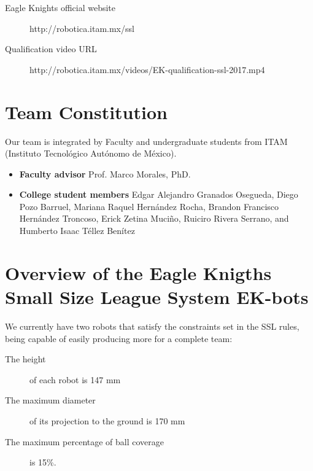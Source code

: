 \documentclass[]{llncs}
\newcommand{\TODO}[1]{{\textcolor{blue}{ToDo: {#1}}}}
\begin{document}
\begin{description}
	\item[Eagle Knights official website] http://robotica.itam.mx/ssl
	\item[Qualification video URL] http://robotica.itam.mx/videos/EK-qualification-ssl-2017.mp4
\end{description}


\section{Team Constitution}

Our team is integrated by Faculty and undergraduate students from ITAM (Instituto Tecnológico Autónomo de México).
\begin{itemize}
\item {\bf Faculty advisor} Prof. Marco Morales, PhD.
\item {\bf College student members} 
Edgar Alejandro Granados Osegueda,
Diego Pozo Barruel,
Mariana Raquel Hernández Rocha,
Brandon Francisco Hernández Troncoso,
Erick Zetina Muciño,
Ruiciro Rivera Serrano, and
Humberto Isaac Téllez Benítez

\end{itemize}


\section{Overview of the Eagle Knigths Small Size League System EK-bots}

We currently have two robots that satisfy the constraints set in the SSL rules, being capable of easily producing more for a complete team:
\begin{description} 
	\item [The height] of each robot is 147 mm
	\item [The maximum diameter] of its projection to the ground is 170 mm
	\item [The maximum percentage of ball coverage] is 15\%. 
\end{description}

\end{document}
